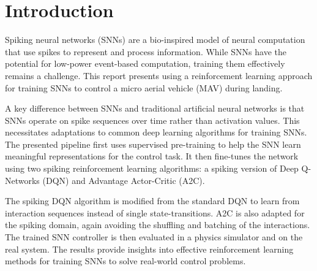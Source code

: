 \section{Introduction} \label{section:introduction}
Spiking neural networks (SNNs) are a bio-inspired model of neural computation that use spikes to represent and process information. While SNNs have the potential for low-power event-based computation, training them effectively remains a challenge. This report presents using a reinforcement learning approach for training SNNs to control a micro aerial vehicle (MAV) during landing.

A key difference between SNNs and traditional artificial neural networks is that SNNs operate on spike sequences over time rather than activation values. This necessitates adaptations to common deep learning algorithms for training SNNs. The presented pipeline first uses supervised pre-training to help the SNN learn meaningful representations for the control task. It then fine-tunes the network using two spiking reinforcement learning algorithms: a spiking version of Deep Q-Networks (DQN) and Advantage Actor-Critic (A2C).

The spiking DQN algorithm is modified from the standard DQN to learn from interaction sequences instead of single state-transitions. A2C is also adapted for the spiking domain, again avoiding the shuffling and batching of the interactions. The trained SNN controller is then evaluated in a physics simulator and on the real system. The results provide insights into effective reinforcement learning methods for training SNNs to solve real-world control problems.
